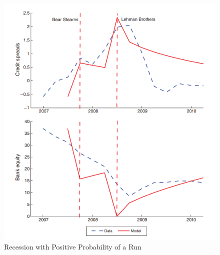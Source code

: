 \begin{frame}
    \begin{figure}
        \centering
        \includegraphics[height = 0.9\textheight]{fig/fig7.png}
        \caption{Recession with Positive Probability of a Run}
    \end{figure}
\end{frame}